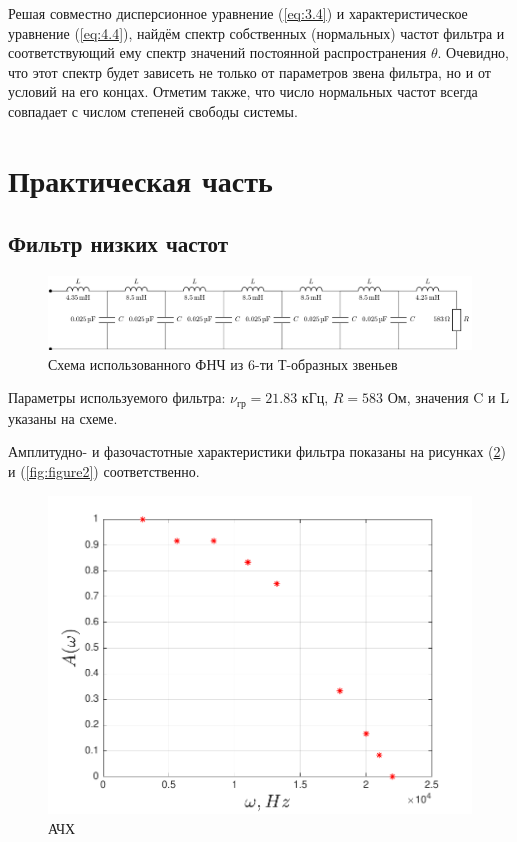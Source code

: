 Решая совместно дисперсионное уравнение (\ref{eq:3.4}) и характеристическое уравнение (\ref{eq:4.4}), найдём спектр собственных (нормальных) частот фильтра и соответствующий ему спектр значений постоянной распространения $\theta$. Очевидно, что этот спектр будет зависеть не только от параметров звена фильтра, но и от условий на его концах. Отметим также, что число нормальных частот всегда совпадает с числом степеней свободы системы.


\section{Практическая часть}
\subsection{Фильтр низких частот}
\begin{figure}[H]
	\centering
	\includegraphics[scale=0.75]{chem/chem3}
	\caption{ Схема использованного ФНЧ из 6-ти Т-образных звеньев}
	\label{fig:chem3}
\end{figure}
Параметры используемого фильтра:
$\nu_{\text{гр}}=21.83 \text{ кГц} ,\,R=583\text{ Ом}$, значения C и L указаны на схеме.

Амплитудно- и фазочастотные характеристики фильтра показаны на рисунках (\ref{fig:figure1}) и (\ref{fig:figure2}) соответственно.
\begin{figure}[h!]
	\centering
	\includegraphics[]{graph/graph1}
	\caption{АЧХ}
	\label{fig:figure1}
\end{figure}

